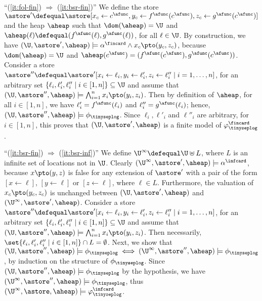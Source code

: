 \noindent ``(\ref{it:fol-fin}) $\Rightarrow$ (\ref{it:bsr-fin})'' We
define the store $\astore' \defequal \astore[x_c \leftarrow
  c^\afunc,y_c \leftarrow f^\afunc(c^\afunc),z_c \leftarrow
  g^\afunc(c^\afunc)]$ and the heap $\aheap$ such that $\dom(\aheap) =
\U$ and $\aheap(\ell) \defequal (f^\afunc(\ell), g^\afunc(\ell))$, for
all $\ell \in \U$. By construction, we have $(\U,\astore',\aheap)
\models \alpha^\fincard \wedge x_c \pto (y_c,z_c)$, because
$\dom(\aheap) = \U$ and $\aheap(c^\afunc) = (f^\afunc(c^\afunc),
g^\afunc(c^\afunc))$. Consider a store $\astore'' \defequal
\astore'[x_i \leftarrow \ell_i, y_i \leftarrow \ell'_i, z_i \leftarrow
  \ell''_i \mid i=1,\ldots,n]$, for an arbitrary set
$\{\ell_i,\ell'_i,\ell''_i \mid i \in [1,n]\} \subseteq \U$ and assume
that $(\U, \astore'', \aheap) \models \bigwedge_{i=1}^n x_i \pto
(y_i,z_i)$. Then by definition of $\aheap$, for all $i\in [1,n]$, we
have $\ell_i' = f^\afunc(\ell_i)$ and $\ell''_i = g^\afunc(\ell_i)$;
hence, $(\U, \astore'', \aheap)\models \phi_{\tinyseplog}$. Since
$\ell_i, \ell'_i$ and $\ell''_i$ are arbitrary, for $i \in [1,n]$,
this proves that $(\U, \astore', \aheap)$ is a finite model of
$\varphi^\fincard_\tinyseplog$.

\noindent``(\ref{it:bsr-fin}) $\Rightarrow$ (\ref{it:bsr-inf})'' We
define $\U^\infty \defequal \U \uplus L$, where $L$ is an infinite set
of locations not in $\U$. Clearly $(\U^\infty,\astore',\aheap) \models
\alpha^\infcard$, because $x \pto (y,z)$ is false for any extension of
$\astore'$ with a pair of the form $[x \leftarrow \ell]$, $[y
  \leftarrow \ell]$ or $[z \leftarrow \ell]$, where $\ell \in
L$. Furthermore, the valuation of $x_c \pto (y_c,z_c)$ is unchanged
between $(\U,\astore',\aheap)$ and
$(\U^\infty,\astore',\aheap)$. Consider a store $\astore'' \defequal
\astore'[x_i \leftarrow \ell_i, y_i \leftarrow \ell'_i, z_i \leftarrow
  \ell''_i \mid i=1,\ldots,n]$, for an arbitrary set
$\{\ell_i,\ell'_i,\ell''_i \mid i \in [1,n]\} \subseteq \U$ and assume
that $(\U, \astore'', \aheap)\models \bigwedge_{i=1}^n x_i \pto
(y_i,z_i)$. Then necessarily, $\set{\ell_i,\ell'_i,\ell''_i \mid i \in
  [1,n]} \cap L = \emptyset$.  Next, we show that
$(\U,\astore'',\aheap) \models \phi_{\tinyseplog} \iff
(\U^\infty,\astore'',\aheap) \models \phi_{\tinyseplog}$, by induction
on the structure of $\phi_{\tinyseplog}$. Since $(\U,\astore'',\aheap)
\models \phi_{\tinyseplog}$ by the hypothesis, we have $(\U^\infty,
\astore'', \aheap)\models \phi_{\tinyseplog}$, thus $(\U^\infty,
\astore, \aheap) \models \varphi^\infcard_\tinyseplog$.
  

